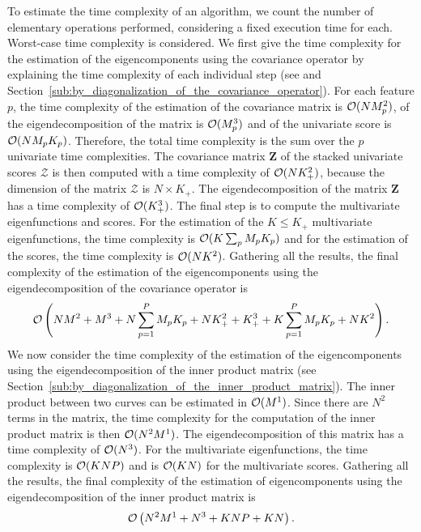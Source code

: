 To estimate the time complexity of an algorithm, we count the number of elementary operations performed, considering a fixed execution time for each. Worst-case time complexity is considered. We first give the time complexity for the estimation of the eigencomponents using the covariance operator by explaining the time complexity of each individual step (see \cite{happMultivariateFunctionalPrincipal2018a} and Section~\ref{sub:by_diagonalization_of_the_covariance_operator}). For each feature $p$, the time complexity of the estimation of the covariance matrix is $\operatorname{\mathcal{O}}(NM_p^2)$, of the eigendecomposition of the matrix is $\operatorname{\mathcal{O}}(M_p^3)$ and of the univariate score is $\operatorname{\mathcal{O}}(NM_pK_p)$. Therefore, the total time complexity is the sum over the $p$ univariate time complexities. The covariance matrix $\mathbf{Z}$ of the stacked univariate scores $\mathcal{Z}$ is then computed with a time complexity of $\operatorname{\mathcal{O}}(NK_+^2)$, because the dimension of the matrix $\mathcal{Z}$ is $N \times K_+$. The eigendecomposition of the matrix $\mathbf{Z}$ has a time complexity of $\operatorname{\mathcal{O}}(K_+^3)$. The final step is to compute the multivariate eigenfunctions and scores. For the estimation of the $K \leq K_+$ multivariate eigenfunctions, the time complexity is $\operatorname{\mathcal{O}}(K\sum_{p} M_pK_p)$ and for the estimation of the scores, the time complexity is $\operatorname{\mathcal{O}}(NK^2)$. Gathering all the results, the final complexity of the estimation of the eigencomponents using the eigendecomposition of the covariance operator is
\begin{equation}\label{eq:time_compl_cov}
    \operatorname{\mathcal{O}}\left(NM^2 + M^3 + N\sum_{p = 1}^P M_pK_p + NK_+^2 + K_+^3 + K\sum_{p = 1}^P M_pK_p + NK^2\right).
\end{equation}
We now consider the time complexity of the estimation of the eigencomponents using the eigendecomposition of the inner product matrix (see Section~\ref{sub:by_diagonalization_of_the_inner_product_matrix}). The inner product between two curves can be estimated in $\operatorname{\mathcal{O}}(M^1)$. Since there are $N^2$ terms in the matrix, the time complexity for the computation of the inner product matrix is then $\operatorname{\mathcal{O}}(N^2M^1)$. The eigendecomposition of this matrix has a time complexity of $\operatorname{\mathcal{O}}(N^3)$. For the multivariate eigenfunctions, the time complexity is $\operatorname{\mathcal{O}}(KNP)$ and is $\operatorname{\mathcal{O}}(KN)$ for the multivariate scores. Gathering all the results, the final complexity of the estimation of eigencomponents using the eigendecomposition of the inner product matrix is
\begin{equation}\label{eq:time_compl_in_prod}
    \operatorname{\mathcal{O}}\left(N^2M^1 + N^3 + KNP + KN\right).
\end{equation}

